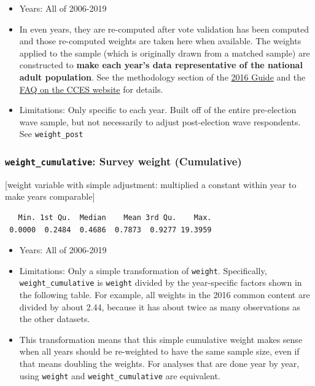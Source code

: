 \documentclass[10pt,article,oneside]{memoir}
\theoremstyle{definition}
\begin{document}
\begin{itemize}
\tightlist
\item
  Years: All of 2006-2019
\item
  In even years, they are re-computed after vote validation has been
  computed and those re-computed weights are taken here when available.
  The weights applied to the sample (which is originally drawn from a
  matched sample) are constructed to \textbf{make each year's data
  representative of the national adult population}. See the methodology
  section of the
  \href{https://dataverse.harvard.edu/api/access/datafile/3047286}{2016
  Guide} and the
  \href{https://cces.gov.harvard.edu/frequently-asked-questions}{FAQ on
  the CCES website} for details.
\item
  Limitations: Only specific to each year. Built off of the entire
  pre-election wave sample, but not necessarily to adjust post-election
  wave respondents. See \texttt{weight\_post}
\end{itemize}

\hypertarget{weight_cumulative-survey-weight-cumulative}{%
\subsubsection{\texorpdfstring{\texttt{weight\_cumulative}: Survey
weight
(Cumulative)}{weight\_cumulative: Survey weight (Cumulative)}}\label{weight_cumulative-survey-weight-cumulative}}

{[}weight variable with simple adjustment: multiplied a constant within
year to make years comparable{]}

\begin{verbatim}
   Min. 1st Qu.  Median    Mean 3rd Qu.    Max. 
 0.0000  0.2484  0.4686  0.7873  0.9277 19.3959 
\end{verbatim}

\begin{itemize}
\tightlist
\item
  Years: All of 2006-2019
\item
  Limitations: Only a simple transformation of \texttt{weight}.
  Specifically, \texttt{weight\_cumulative} is \texttt{weight} divided
  by the year-specific factors shown in the following table. For
  example, all weights in the 2016 common content are divided by about
  2.44, because it has about twice as many observations as the other
  datasets.
\item
  This transformation means that this simple cumulative weight makes
  sense when all years should be re-weighted to have the same sample
  size, even if that means doubling the weights. For analyses that are
  done year by year, using \texttt{weight} and
  \texttt{weight\_cumulative} are equivalent.
\end{itemize}
\end{document}
